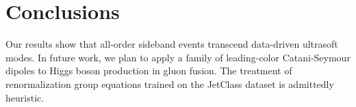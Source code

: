 \section{Conclusions}\label{sec:conclusions}

Our results show that all-order sideband events transcend data-driven
ultrasoft modes. In future work, we plan to apply a family of
leading-color Catani-Seymour dipoles to Higgs boson production in gluon
fusion. The treatment of renormalization group equations trained on the
JetClass dataset is admittedly heuristic.


